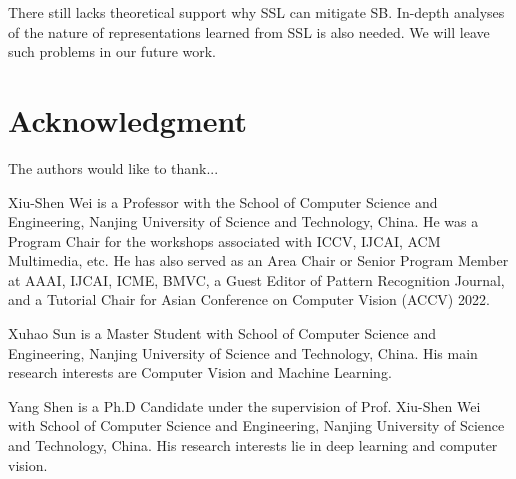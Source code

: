 \documentclass[10pt,journal,compsoc]{IEEEtran}
\begin{document}
There still lacks theoretical support why SSL can mitigate SB. In-depth analyses of the nature of representations learned from SSL is also needed. We will leave such problems in our future work.

\iffalse
\ifCLASSOPTIONcompsoc
\section*{Acknowledgments}
\else
\section*{Acknowledgment}
\fi


The authors would like to thank...


\ifCLASSOPTIONcaptionsoff
  \newpage
\fi

\fi









\begin{IEEEbiography}{Xiu-Shen Wei} is a Professor with the School of Computer Science and Engineering, Nanjing University of Science and Technology, China. He was a Program Chair for the workshops associated with ICCV, IJCAI, ACM Multimedia, etc. He has also served as an Area Chair or Senior Program Member at AAAI, IJCAI, ICME, BMVC, a Guest Editor of Pattern Recognition Journal, and a Tutorial Chair for Asian Conference on Computer Vision (ACCV) 2022.
\end{IEEEbiography}

\begin{IEEEbiography}{Xuhao Sun} is a Master Student with School of Computer Science and Engineering, Nanjing University of Science and Technology, China. His main research interests are Computer Vision and Machine Learning.
\end{IEEEbiography}

\begin{IEEEbiography}{Yang Shen} is a Ph.D Candidate under the supervision of Prof. Xiu-Shen Wei with School of Computer Science and Engineering, Nanjing University of Science and Technology, China. His research interests lie in deep learning and computer vision.
\end{IEEEbiography}
\end{document}
